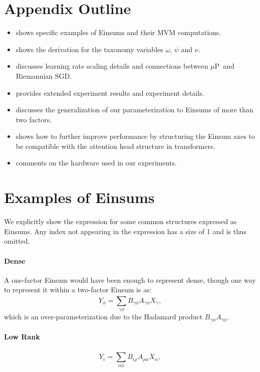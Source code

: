 \documentclass{article}
\newcommand{\mup}{$\mu$P}
\begin{document}
\clearpage
\appendix
\section*{Appendix Outline}

\begin{itemize}
    \item {} shows specific examples of Einsums and their MVM computations.
    \item {} shows the derivation for the taxonomy variables $\omega$, $\psi$ and $\nu.$
    \item {} discusses learning rate scaling details and connections between \mup\ and Riemannian SGD.
    \item {} provides extended experiment results and experiment details.
    \item {} discusses the generalization of our parameterization to Einsums of more than two factors.
    \item {} shows how to further improve performance by structuring the Einsum axes to be compatible with the attention head structure in transformers.
    \item {} comments on the hardware used in our experiments.
\end{itemize}


\section{Examples of Einsums} \label{app:examples}
We explicitly show the expression for some common structures expressed as Einsums. Any index not appearing in the expression has a size of 1 and is thus omitted.
\paragraph{Dense}
A one-factor Einsum would have been enough to represent dense, though one way to represent it within a two-factor Einsum is as:
\begin{equation}
    Y_{\phi}
      =
      \sum_{\gamma\phi}^{}
      B_{\gamma\phi} A_{\gamma \phi} X_{\gamma},
\end{equation}
which is an over-parameterization due to the Hadamard product $B_{\gamma\phi} A_{\gamma \phi}.$
\paragraph{Low Rank}
\begin{equation}
    Y_{\epsilon}
      =
      \sum_{\alpha\phi}^{}
      B_{\epsilon\rho} A_{\rho \alpha} X_{\alpha},
\end{equation}
\end{document}
